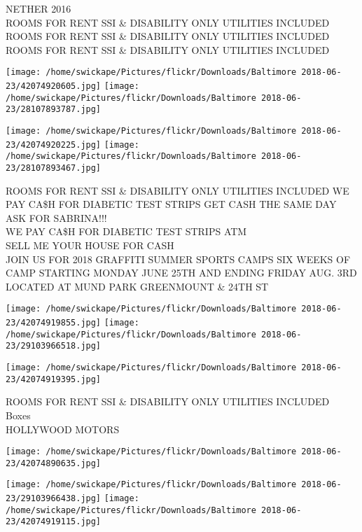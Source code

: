 \documentclass[10pt,letterpaper]{article}
\begin{document}
NETHER 2016\\
ROOMS FOR RENT SSI \& DISABILITY ONLY UTILITIES INCLUDED\\
ROOMS FOR RENT SSI \& DISABILITY ONLY UTILITIES INCLUDED\\
ROOMS FOR RENT SSI \& DISABILITY ONLY UTILITIES INCLUDED\\
\pagebreak

\texttt{[image: /home/swickape/Pictures/flickr/Downloads/Baltimore 2018-06-23/42074920605.jpg]}
\texttt{[image: /home/swickape/Pictures/flickr/Downloads/Baltimore 2018-06-23/28107893787.jpg]}

\texttt{[image: /home/swickape/Pictures/flickr/Downloads/Baltimore 2018-06-23/42074920225.jpg]}
\texttt{[image: /home/swickape/Pictures/flickr/Downloads/Baltimore 2018-06-23/28107893467.jpg]}

ROOMS FOR RENT SSI \& DISABILITY ONLY UTILITIES INCLUDED WE PAY CA\$H FOR DIABETIC TEST STRIPS GET CASH THE SAME DAY ASK FOR SABRINA!!!\\
WE PAY CA\$H FOR DIABETIC TEST STRIPS ATM\\
SELL ME YOUR HOUSE FOR CASH\\
JOIN US FOR 2018 GRAFFITI SUMMER SPORTS CAMPS SIX WEEKS OF CAMP STARTING MONDAY JUNE 25TH AND ENDING FRIDAY AUG. 3RD LOCATED AT MUND PARK GREENMOUNT \& 24TH ST\\
\pagebreak

\texttt{[image: /home/swickape/Pictures/flickr/Downloads/Baltimore 2018-06-23/42074919855.jpg]}
\texttt{[image: /home/swickape/Pictures/flickr/Downloads/Baltimore 2018-06-23/29103966518.jpg]}

\texttt{[image: /home/swickape/Pictures/flickr/Downloads/Baltimore 2018-06-23/42074919395.jpg]}

ROOMS FOR RENT SSI \& DISABILITY ONLY UTILITIES INCLUDED\\
Boxes\\
HOLLYWOOD MOTORS\\
\pagebreak

\texttt{[image: /home/swickape/Pictures/flickr/Downloads/Baltimore 2018-06-23/42074890635.jpg]}

\vspace{0.25in}
\texttt{[image: /home/swickape/Pictures/flickr/Downloads/Baltimore 2018-06-23/29103966438.jpg]}
\texttt{[image: /home/swickape/Pictures/flickr/Downloads/Baltimore 2018-06-23/42074919115.jpg]}
\end{document}
